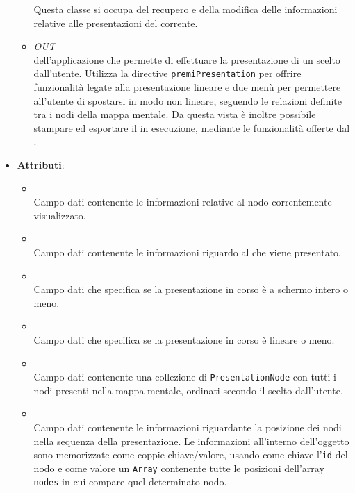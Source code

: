 \begin{itemize}
\begin{itemize}
Questa classe si occupa del recupero e della modifica delle informazioni relative alle presentazioni del  corrente.
\item \textit{OUT} \hyperref[\nogloxy{Premi::Front-End::Views::PresentationView}]{}\\
 dell’applicazione che permette di effettuare la presentazione di un  scelto dall’utente. Utilizza la directive \texttt{premiPresentation} per offrire funzionalità legate alla presentazione lineare e due menù per permettere all'utente di spostarsi in modo non lineare, seguendo le relazioni definite tra i nodi della mappa mentale.
Da questa vista è inoltre possibile stampare ed esportare il  in esecuzione, mediante le funzionalità offerte dal .
\end{itemize}
\item \textbf{Attributi}:
\begin{itemize}
\item {}
\\ Campo dati contenente le informazioni relative al nodo correntemente visualizzato.
\item {}
\\ Campo dati contenente le informazioni riguardo al  che viene presentato.
\item {}
\\ Campo dati che specifica se la presentazione in corso è a schermo intero o meno.
\item {}
\\ Campo dati che specifica se la presentazione in corso è lineare o meno.
\item {}
\\ Campo dati contenente una collezione di \texttt{PresentationNode} con tutti i nodi presenti nella mappa mentale, ordinati secondo il  scelto dall'utente.
\item {}
\\ Campo dati contenente le informazioni riguardante la posizione dei nodi nella sequenza della presentazione. Le informazioni all'interno dell'oggetto sono memorizzate come coppie chiave/valore, usando come chiave l'\texttt{id} del nodo e come valore un \texttt{Array} contenente tutte le posizioni dell'array \texttt{nodes} in cui compare quel determinato nodo.

\end{itemize}
\end{itemize}
